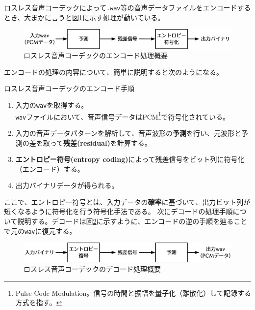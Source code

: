 \documentclass[uplatex,dvipdfmx,b5j,10pt]{jsbook}
\theoremstyle{definition}
\begin{document}
ロスレス音声コーデックによって\texttt{.wav}等の音声データファイルをエンコードするとき、大まかに言うと図\ref{encode_procedure}に示す処理が動いている。
\begin{figure}[htbp]
  \begin{center}
    \includegraphics[width=130mm]{./figs/encode_procedure.png}
    \caption{ロスレス音声コーデックのエンコード処理概要} \label{encode_procedure}
  \end{center}
\end{figure}

エンコードの処理の内容について、簡単に説明すると次のようになる。

\begin{itembox}[l]{ロスレス音声コーデックのエンコード手順}
  \begin{enumerate}
    \item 入力の\texttt{wav}を取得する。\\ 
      \texttt{wav}ファイルにおいて、音声信号データはPCM\footnote{Pulse Code Modulation。信号の時間と振幅を量子化（離散化）して記録する方式を指す。}で符号化されている。
    \item 入力の音声データパターンを解析して、音声波形の\textbf{予測}を行い、元波形と予測の差を取って\textbf{残差(residual)}を計算する。
    \item \textbf{エントロピー符号(entropy coding)}によって残差信号をビット列に符号化（エンコード）する。 
    \item 出力バイナリデータが得られる。
  \end{enumerate}
\end{itembox}

ここで、エントロピー符号とは、入力データの\textbf{確率}に基づいて、出力ビット列が短くなるように符号化を行う符号化手法である。
次にデコードの処理手順について説明する。デコードは図\ref{decode_procedure}に示すように、エンコードの逆の手順を辿ることで元の\texttt{wav}に復元する。
\begin{figure}[htbp]
  \begin{center}
    \includegraphics[width=130mm]{./figs/decode_procedure.png}
    \caption{ロスレス音声コーデックのデコード処理概要} \label{decode_procedure}
  \end{center}
\end{figure}
\end{document}
